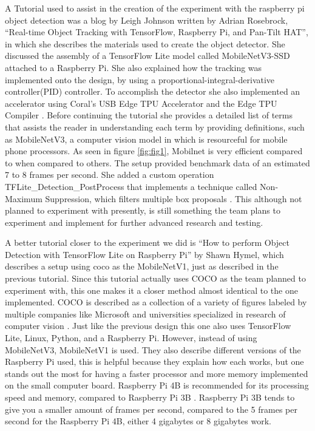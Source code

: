 A Tutorial used to assist in the creation of the experiment with the raspberry pi object detection was a blog by Leigh Johnson written by Adrian Rosebrock, “Real-time Object Tracking with TensorFlow, Raspberry Pi, and Pan-Tilt HAT”, in which she describes the materials used to create the object detector. She discussed the assembly of a TensorFlow Lite model called MobileNetV3-SSD attached to a Raspberry Pi. She also explained how the tracking was implemented onto the design, by using a proportional-integral-derivative controller(PID) controller. To accomplish the detector she also implemented an accelerator using Coral's USB Edge TPU Accelerator and the Edge TPU Compiler \cite{Johnson}. Before continuing the tutorial she provides a detailed list of terms that assists the reader in understanding each term by providing definitions, such as MobileNetV3, a computer vision model in which is resourceful for mobile phone processors. As seen in figure \ref{fig:fig1}, Mobilnet is very efficient compared to when compared to others. The setup provided benchmark data of an estimated 7 to 8 frames per second. She added a custom operation TFLite\_Detection\_PostProcess that implements a technique called Non-Maximum Suppression, which filters multiple box proposals \cite{Johnson}. This although not planned to experiment with presently, is still something the team plans to experiment and implement for further advanced research and testing.

A better tutorial closer to the experiment we did is “How to perform Object Detection with TensorFlow Lite on Raspberry Pi” by Shawn Hymel, which describes a setup using coco as the MobileNetV1, just as described in the previous tutorial. Since this tutorial actually uses COCO as the team planned to experiment with, this one makes it a closer method almost identical to the one implemented. COCO is described as a collection of a variety of figures labeled by multiple companies like Microsoft and universities specialized in research of computer vision \cite{Hymel}. Just like the previous design this one also uses TensorFlow Lite, Linux, Python, and a Raspberry Pi. However, instead of using MobileNetV3, MobileNetV1 is used. They also describe different versions of the Raspberry Pi used, this is helpful because they explain how each works, but one stands out the most for having a faster processor and more memory implemented on the small computer board. Raspberry Pi 4B is recommended for its processing speed and memory, compared to Raspberry Pi 3B \cite{Hymel}. Raspberry Pi 3B tends to give you a smaller amount of frames per second, compared to the 5 frames per second for the Raspberry Pi 4B, either 4 gigabytes or 8 gigabytes work.

